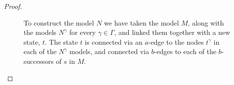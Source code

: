\begin{proof}
\begin{figure}[H]
\begin{center} %
\caption{
To construct the model $N$ we have taken the model $M$, along with the models
$N^\gamma$ for every $\gamma \in \Gamma$, and linked them together with a new
state, $t$. The state $t$ is connected via an $a$-edge to the nodes $t^\gamma$
in each of the $N^\gamma$ models, and connected via $b$-edges to each of the
$b$-successors of $s$ in $M$.}
\end{center}
\end{figure}


\end{proof}
